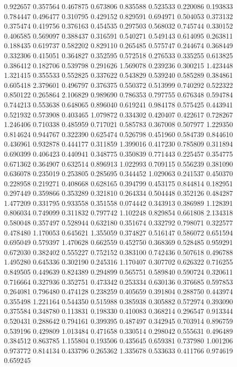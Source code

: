 0.922657
0.357564
0.467875
0.673806
0.835588
0.523533
0.220086
0.193833
0.784447
0.496477
0.310795
0.429152
0.829591
0.694971
0.504053
0.373132
0.375474
0.419756
0.376163
0.454535
0.297503
0.568032
0.745744
0.330152
0.406585
0.569097
0.388437
0.316591
0.540271
0.549143
0.614095
0.263811
0.188435
0.619737
0.582202
0.829110
0.265485
0.575747
0.244674
0.368449
0.332306
0.415051
0.364827
0.352595
0.572518
0.276533
0.335255
0.613825
0.386412
0.182706
0.539798
0.291626
1.569078
0.239236
0.300215
1.423448
1.321415
0.355533
0.552825
0.337622
0.543829
0.539240
0.585289
0.384861
0.605418
2.379601
0.496797
0.376375
0.550372
0.513999
0.740292
0.522322
0.850122
0.265864
2.106829
0.989690
0.786353
0.797755
0.676348
0.594784
0.744213
0.553638
0.648065
0.896040
0.619241
0.984178
0.575425
0.443941
0.521932
0.573908
0.403465
1.079872
0.334302
0.420407
0.422617
0.728267
1.246406
0.710338
0.485959
0.717021
0.585783
0.367008
0.507977
1.229350
0.814624
0.944767
0.322390
0.625474
0.526798
0.451960
0.584739
0.844610
0.436961
0.932878
0.444177
0.311859
1.399016
0.417230
0.785809
0.311894
0.690399
0.406423
0.440941
0.348775
0.350839
0.771443
0.225457
0.354775
0.671362
0.364907
0.632514
0.896913
1.022993
0.709115
0.556239
0.381090
0.636078
0.235019
0.253805
0.285695
0.344452
1.029063
0.241537
0.450370
0.228958
0.219271
0.408668
0.628165
0.394799
0.453175
0.844814
0.182951
0.297449
0.359866
0.353289
0.321810
0.264334
0.504448
0.352126
0.484287
1.477209
0.331795
0.933558
0.351558
0.074442
0.343913
0.386989
1.128391
0.806034
0.749099
0.311832
0.797742
1.102248
0.829854
0.661808
2.134318
0.580048
0.357497
0.528944
0.632180
0.351674
0.332792
0.798071
0.322577
0.478480
1.170053
0.645621
1.355059
0.374827
0.516147
0.586072
0.651594
0.695049
0.579397
1.470628
0.662559
0.452750
0.368369
0.528485
0.959291
0.672030
0.382402
0.555227
0.752152
0.383100
0.742436
0.507618
0.496788
1.495280
0.645336
0.302190
0.245316
1.170407
0.307702
0.626322
0.716255
0.849505
0.449639
0.824389
0.294899
0.565751
0.589840
0.590724
0.320611
0.716664
0.327936
0.352751
0.473342
0.253334
0.630136
0.376685
0.597853
0.264081
0.796480
0.474128
0.238259
0.405659
0.391804
0.288750
0.443974
0.355498
1.221164
0.544350
0.515988
0.385938
0.305882
0.572974
0.393090
0.375584
0.348780
0.113831
0.198330
0.410083
0.368214
0.296547
0.913344
0.520431
0.288642
0.794161
0.399395
0.487497
0.342945
0.703914
0.896759
0.539196
0.429809
1.013484
0.471658
0.330514
0.298042
0.555631
0.496489
0.384512
0.863785
1.155804
0.193506
0.435645
0.659381
0.737980
1.001206
0.973772
0.814134
0.433796
0.265362
1.335678
0.533633
0.411766
0.974619
0.659245
